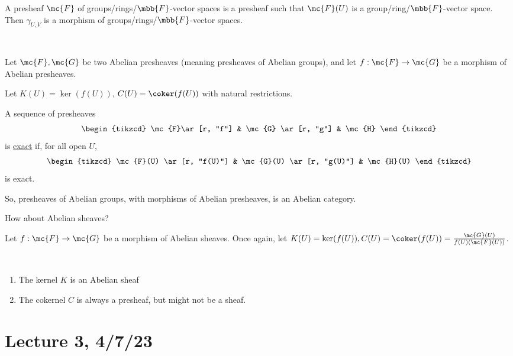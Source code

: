 \documentclass[x11names,reqno,14pt]{extarticle}
\begin{document}
A presheaf $\mc{F}$ of groups/rings/$\mbb{F}$-vector spaces is a presheaf such that $\mc{F}(U)$ is a group/ring/$\mbb{F}$-vector space. Then $\gamma_{U,V}$ is a morphism of groups/rings/$\mbb{F}$-vector spaces. 

\,

Let $\mc{F},\mc{G}$ be two Abelian presheaves (meaning presheaves of Abelian groups), and let $f:\mc{F}\to\mc{G}$ be a morphism of Abelian presheaves. 

Let $K(U) = \ker(f(U))$, $C(U) = \coker(f(U))$ with natural restrictions.


A sequence of presheaves
\[
\begin{tikzcd}
\mc{F}\ar[r, "f"] & \mc{G} \ar[r, "g"] & \mc{H}
\end{tikzcd}
\]
is \underline{exact} if, for all open $U$, 
\[
\begin{tikzcd}
\mc{F}(U) \ar[r, "f(U)"] & \mc{G}(U) \ar[r, "g(U)"] & \mc{H}(U)
\end{tikzcd}
\]
is exact. 

So, presheaves of Abelian groups, with morphisms of Abelian presheaves, is an Abelian category.

How about Abelian sheaves? 

Let $f:\mc{F}\to\mc{G}$ be a morphism of Abelian sheaves. Once again, let $K(U) = \ker(f(U)), C(U) = \coker(f(U)) = \frac{\mc{G}(U)}{f(U)(\mc{F}(U))}$. 

\prop\,

\begin{enumerate}[label=(\alph*)]

\item The kernel $K$ is an Abelian sheaf

\item The cokernel $C$ is always a presheaf, but might not be a sheaf.


\end{enumerate}

\section*{Lecture 3, 4/7/23}

\proof\,
\end{document}
